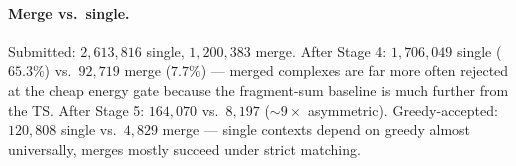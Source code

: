 \paragraph{Merge vs.\ single.}
Submitted: $2{,}613{,}816$ single, $1{,}200{,}383$ merge. After Stage 4: $1{,}706{,}049$ single ($65.3\%$) vs.\ $92{,}719$ merge ($7.7\%$) --- merged complexes are far more often rejected at the cheap energy gate because the fragment-sum baseline is much further from the TS. After Stage 5: $164{,}070$ vs.\ $8{,}197$ ($\sim 9\times$ asymmetric). Greedy-accepted: $120{,}808$ single vs.\ $4{,}829$ merge --- single contexts depend on greedy almost universally, merges mostly succeed under strict matching.
